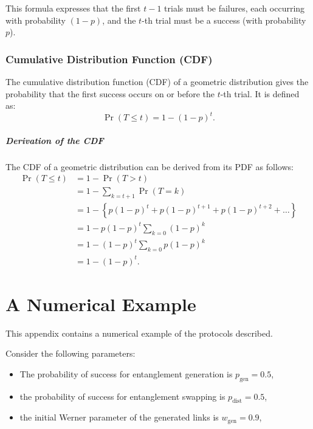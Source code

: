 \documentclass{masterthesis}
\begin{document}
This formula expresses that the first $t-1$ trials must be failures, each occurring with probability $(1-p)$, and the $t$-th trial must be a success (with probability $p$).

\subsection*{Cumulative Distribution Function (CDF)}\label{subsection:geometric_cdf}

The cumulative distribution function (CDF) of a geometric distribution gives the probability that the first success occurs on or before the $t$-th trial. It is defined as:
\begin{equation}
    \Pr(T \leq t) = 1 - (1 - p)^t.
\end{equation}

\paragraph*{Derivation of the CDF}
The CDF of a geometric distribution can be derived from its PDF as follows:
\begin{align*}
    \Pr(T \leq t) &= 1 - \Pr(T > t) \\
    &= 1 - \sum_{k=t+1} \Pr(T = k) \\
    &= 1 - \left\{p (1 - p)^t + p (1 - p)^{t+1} + p (1 - p)^{t+2} + \ldots\right\} \\
    &= 1 - p (1 - p)^t \sum_{k=0} (1 - p)^k \\
    &= 1 - (1 - p)^t \sum_{k=0} p (1 - p)^k \\
    &= 1 - (1 - p)^t.
\end{align*} %

\chapter*{A Numerical Example}

This appendix contains a numerical example of the protocols described.

Consider the following parameters:
\begin{itemize}
    \item The probability of success for entanglement generation is $p_{\text{gen}} = 0.5$,
    \item the probability of success for entanglement swapping is $p_{\text{dist}} = 0.5$,
    \item the initial Werner parameter of the generated links is $w_{\text{gen}} = 0.9$,
\end{itemize}
\end{document}
